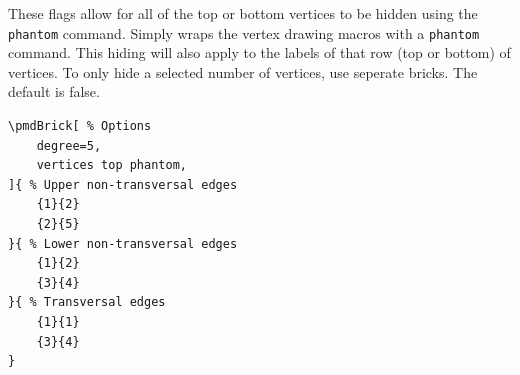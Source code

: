 \documentclass{ltxdoc}
\begin{document}
These flags allow for all of the top or bottom vertices to be hidden using the \texttt{phantom} command. Simply wraps the vertex drawing macros with a \texttt{phantom} command. This hiding will also apply to the labels of that row (top or bottom) of vertices. To only hide a selected number of vertices, use seperate bricks. The default is false.
\begin{center}
    \begin{minipage}{\dimexpr0.85\textwidth-2\fboxrule-2\fboxsep\relax}
        \begin{minipage}[c]{0.4\linewidth}
\begin{verbatim}
\pmdBrick[ % Options
    degree=5,
    vertices top phantom,
]{ % Upper non-transversal edges
    {1}{2}
    {2}{5}
}{ % Lower non-transversal edges
    {1}{2}
    {3}{4}
}{ % Transversal edges
    {1}{1}
    {3}{4}
}
\end{verbatim}
        \end{minipage}
        \hfill
        \begin{minipage}[c]{0.4\linewidth}
        \end{minipage}
    \end{minipage}%
\end{center}
\end{document}
